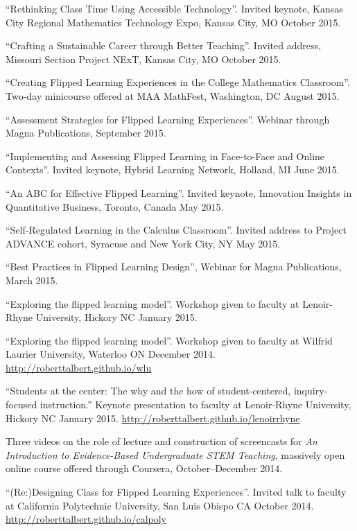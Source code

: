 \documentclass[letterpaper]{article}
\renewenvironment{itemize}{
  \begin{list}{}{
    \setlength{\leftmargin}{1.5em}
	\setlength{\itemsep}{0in}
  }
}{
  \end{list}
}
\begin{document}
\begin{itemize}
	\item ``Rethinking Class Time Using Accessible Technology''. Invited keynote, Kansas City Regional Mathematics Technology Expo, Kansas City, MO October 2015.
	\item ``Crafting a Sustainable Career through Better Teaching''. Invited address, Missouri Section Project NExT, Kansas City, MO October 2015.
	\item ``Creating Flipped Learning Experiences in the College Mathematics Classroom''. Two-day minicourse offered at MAA MathFest, Washington, DC August 2015.
	\item ``Assessment Strategies for Flipped Learning Experiences''. Webinar through Magna Publications, September 2015.
	\item ``Implementing and Assessing Flipped Learning in Face-to-Face and Online Contexts''. Invited keynote, Hybrid Learning Network, Holland, MI June 2015.
	\item ``An ABC for Effective Flipped Learning''. Invited keynote, Innovation Insights in Quantitative Business, Toronto, Canada May 2015.
	\item ``Self-Regulated Learning in the Calculus Classroom''. Invited address to Project ADVANCE cohort, Syracuse and New York City, NY May 2015.
	\item ``Best Practices in Flipped Learning Design'', Webinar for Magna Publications, March 2015.
	\item ``Exploring the flipped learning model''. Workshop given to faculty at Lenoir-Rhyne University, Hickory NC January 2015.
	\item ``Exploring the flipped learning model''. Workshop given to faculty at Wilfrid Laurier University, Waterloo ON December 2014. \url{http://roberttalbert.github.io/wlu}
	\item ``Students at the center: The why and the how of student-centered, inquiry-focused instruction.'' Keynote presentation to faculty at Lenoir-Rhyne University, Hickory NC January 2015. \url{http://roberttalbert.github.io/lenoirrhyne}
	\item Three videos on the role of lecture and construction of screencasts for \emph{An Introduction to Evidence-Based Undergraduate STEM Teaching}, massively open online course offered through Coursera, October--December 2014.
	\item ``(Re:)Designing Class for Flipped Learning Experiences''. Invited talk to faculty at California Polytechnic University, San Luis Obispo CA October 2014. \url{http://roberttalbert.github.io/calpoly}

\end{itemize}
\end{document}
